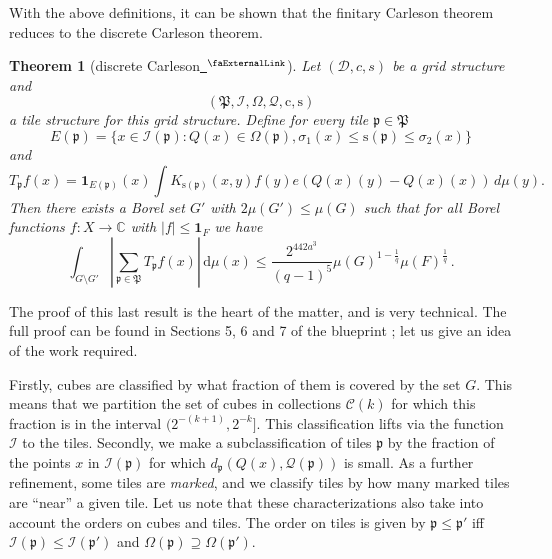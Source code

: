 \documentclass[12pt]{amsart}
\newcommand*{\complex}{\mathbb{C}} %
\newcommand{\extlink}{~\ensuremath{{}^\text{\faExternalLink}}}
\theoremstyle{definition}
\theoremstyle{plain}
\newtheorem{theorem}{Theorem}[subsection]
\newcommand{\pc}{{\mathrm{c}}}
\newcommand{\ps}{{\mathrm{s}}}
\newcommand{\fc}{{\Omega}}
\newcommand{\scI}{{\mathcal{I}}} %
\newcommand{\tQ}{{Q}}
\newcommand{\fcc}{{\mathcal{Q}}}
\newcommand{\fp}{{\mathfrak p}}
\newcommand{\fP}{{\mathfrak P}}
\begin{document}
With the above definitions, it can be shown that the finitary Carleson theorem reduces to the discrete Carleson theorem.

\begin{theorem}[discrete Carleson\href{https://github.com/fpvandoorn/carleson/blob/020d6e5c71d731952eb0379d222eea4049103ca0/Carleson/Discrete/MainTheorem.lean\#L44}{\extlink}]
\label{discrete-Carleson}
Let $(\mathcal{D}, c, s)$ be a grid structure and
\begin{equation*}
    (\fP,\scI,\fc,\fcc,\pc,\ps)
\end{equation*}
a tile structure for this grid structure.
Define for every tile $\fp\in \fP$
\begin{equation}
    E(\fp)=\{x\in \scI(\fp): \tQ(x)\in \fc(\fp) , {\sigma_1}(x)\le \ps(\fp)\le {\sigma_2}(x)\}
\end{equation}
and
\begin{equation}
    T_{\fp} f(x)= \mathbf{1}_{E(\fp)}(x) \int K_{\ps(\fp)}(x,y) f(y) e(\tQ(x)(y)-\tQ(x)(x))\, d\mu(y).
\end{equation}
Then there exists a Borel set $G'$ with $2\mu(G') \leq \mu(G)$ such that for all Borel functions $f\colon X\to \complex$ with $|f|\le \mathbf{1}_F$
we have
\begin{equation}
    \int_{G \setminus G'} \left| \sum_{\fp \in \fP} T_{\fp} f (x) \right| \, \mathrm{d}\mu(x) \le \frac{2^{442a^3}}{(q-1)^5} \mu(G)^{1-\frac{1}{q}} \mu(F)^{\frac{1}{q}}\,.
\end{equation}
\end{theorem}

The proof of this last result is the heart of the matter, and is very technical.
The full proof can be found in Sections 5, 6 and 7 of the blueprint \cite{CarlesonBlueprint};
let us give an idea of the work required.

Firstly, cubes are classified by what fraction of them is covered by the set $G$.
This means that we partition the set of cubes in collections $\mathcal{C}(k)$
for which this fraction is in the interval $(2^{-(k+1)},2^{-k}]$.
This classification lifts via the function $\scI$ to the tiles.
Secondly, we make a subclassification of tiles $\fp$
by the fraction of the points $x$ in $\scI(\fp)$ for which $d_{\fp}(\tQ(x),\fcc(\fp))$ is small.
As a further refinement, some tiles are \emph{marked},
and we classify tiles by how many marked tiles are ``near'' a given tile.
Let us note that these characterizations also take into account the orders on cubes and tiles.
The order on tiles is given by $\fp\le \fp'$ iff
$\scI(\fp)\le \scI(\fp')$ and $\Omega(\fp)\supseteq \Omega(\fp')$.
\end{document}
